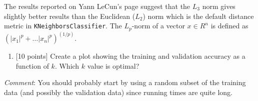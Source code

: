 \documentclass[11pt]{article}
\providecommand{\tightlist}{%
      \setlength{\itemsep}{0pt}\setlength{\parskip}{0pt}}
\begin{document}
The results reported on Yann LeCun's page suggest that the \(L_3\) norm
gives slightly better results than the Euclidean (\(L_2\)) norm which is
the default distance metric in \texttt{KNeighborsClassifier}. The
\(L_p\)-norm of a vector \(x \in R^n\) is defined as
\((|x_1|^p + \ldots |x_n|^p)^{(1/p)}\).

    \begin{enumerate}
\def\labelenumi{\alph{enumi})}
\tightlist
\item
  {[}10 points{]} Create a plot showing the training and validation
  accuracy as a function of \(k\). Which \(k\) value is optimal?
\end{enumerate}

\emph{Comment}: You should probably start by using a random subset of
the training data (and possibly the validation data) since running times
are quite long.
\end{document}
